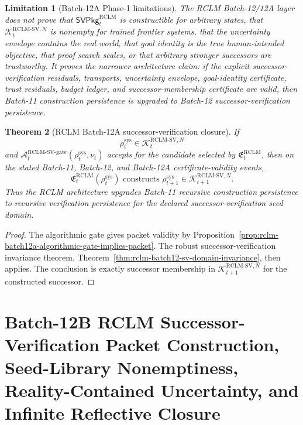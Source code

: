 \documentclass[11pt,a4paper]{article}
\newtheorem{theorem}{Theorem}[section]
\newtheorem{limitation}[theorem]{Limitation}
\newcommand{\Acal}{\mathcal A}
\newcommand{\Kcal}{\mathcal K}
\newcommand{\RCLM}{\mathrm{RCLM}}
\newcommand{\sys}{\mathrm{sys}}
\newcommand{\gate}{\mathrm{gate}}
\begin{document}
\begin{limitation}[Batch-12A Phase-1 limitations]
\label{lim:rclm-batch12a-phase1-limitations}
The RCLM Batch-12/12A layer does not prove that \(\mathsf{SVPkg}_t^{\RCLM}\) is constructible for arbitrary states, that \(\Kcal_t^{\RCLM\text{-}\mathrm{SV},N}\) is nonempty for trained frontier systems, that the uncertainty envelope contains the real world, that goal identity is the true human-intended objective, that proof search scales, or that arbitrary stronger successors are trustworthy. It proves the narrower architecture claim: if the explicit successor-verification residuals, transports, uncertainty envelope, goal-identity certificate, trust residuals, budget ledger, and successor-membership certificate are valid, then Batch-11 construction persistence is upgraded to Batch-12 successor-verification persistence.
\end{limitation}

\begin{theorem}[RCLM Batch-12A successor-verification closure]
\label{thm:rclm-batch12a-successor-verification-closure}
If
\[
\rho_t^{\sys}\in\Kcal_t^{\RCLM\text{-}\mathrm{SV},N}
\]
and \(\Acal_t^{\RCLM\text{-}\mathrm{SV}\text{-}\gate}(\rho_t^{\sys},\nu_t)\) accepts for the candidate selected by \(\mathfrak E_t^{\RCLM}\), then on the stated Batch-11, Batch-12, and Batch-12A certificate-validity events,
\[
\mathfrak E_t^{\RCLM}(\rho_t^{\sys})
\text{ constructs }
\rho_{t+1}^{\sys}
\in
\Kcal_{t+1}^{\RCLM\text{-}\mathrm{SV},N}.
\]
Thus the RCLM architecture upgrades Batch-11 recursive construction persistence to recursive verification persistence for the declared successor-verification seed domain.
\end{theorem}

\begin{proof}
The algorithmic gate gives packet validity by Proposition~\ref{prop:rclm-batch12a-algorithmic-gate-implies-packet}. The robust successor-verification invariance theorem, Theorem~\ref{thm:rclm-batch12-sv-domain-invariance}, then applies. The conclusion is exactly successor membership in \(\Kcal_{t+1}^{\RCLM\text{-}\mathrm{SV},N}\) for the constructed successor.
\end{proof}


\section{Batch-12B RCLM Successor-Verification Packet Construction, Seed-Library Nonemptiness, Reality-Contained Uncertainty, and Infinite Reflective Closure}
\label{sec:rclm-batch12b-sv-packet-nonemptiness-infinite-closure}
\end{document}
